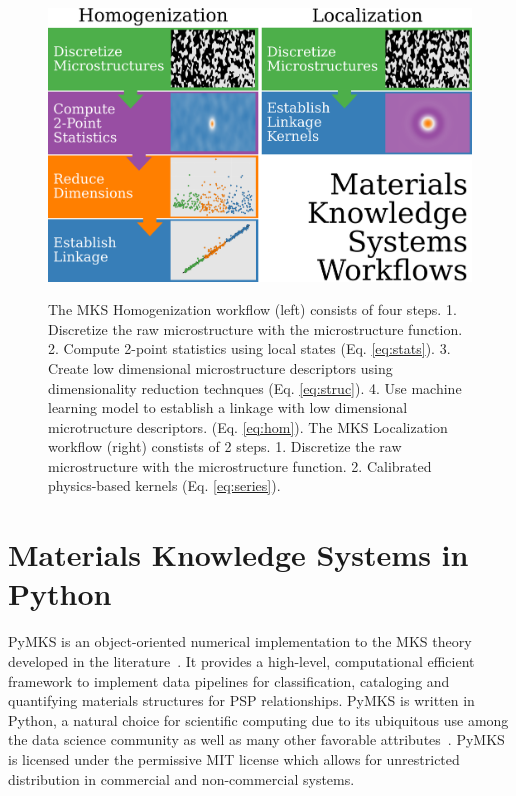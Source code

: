 \documentclass{bmcart}
\begin{document}
\begin{figure}[h!]
  \caption{
     The MKS Homogenization workflow (left) consists of four steps. 1.
     Discretize the raw microstructure with the microstructure function.
     2. Compute 2-point statistics using local states (Eq. \ref{eq:stats}).
     3. Create low dimensional microstructure descriptors using dimensionality
     reduction technques (Eq. \ref{eq:struc}).
     4. Use machine learning model to establish a linkage with low dimensional 
     microtructure descriptors. (Eq. \ref{eq:hom}).
     The MKS Localization workflow (right) constists of 2 steps. 
     1. Discretize the raw microstructure with the microstructure function.
     2. Calibrated physics-based kernels (Eq. \ref{eq:series}).}
    \includegraphics[scale=.22]{fig/mks_workflows.png}
  \label{fig:workflows}
\end{figure}


\section{Materials Knowledge Systems in Python}

PyMKS is an object-oriented numerical implementation to the MKS theory
developed in the literature~\cite{kalidindi2010novel}. It provides a
high-level, computational efficient framework to implement data
pipelines for classification, cataloging and quantifying materials
structures for PSP relationships. PyMKS is written in Python, a
natural choice for scientific computing due to its ubiquitous use
among the data science community as well as many other favorable
attributes~\cite{perez2011python}. PyMKS is licensed under the
permissive MIT license \cite{MIT} which allows for unrestricted
distribution in commercial and non-commercial systems.
\end{document}
